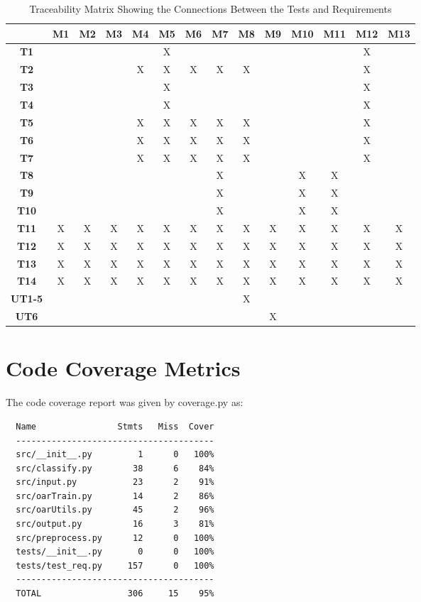 \documentclass[12pt, titlepage]{article}
\begin{document}
\begin{emumerate}
\begin{table}[h!]
  \centering
  \begin{tabular}{|c|c|c|c|c|c|c|c|c|c|c|c|c|c|}
  \hline
    & M1
    & M2
    & M3
    & M4
    & M5
    & M6
    & M7
    & M8
    & M9
    & M10
    & M11
    & M12
    & M13
  \\ \hline
  \textbf{T1}            & & & & &X& & & & & & &X& \\ \hline
  \textbf{T2}            & & & &X&X&X&X&X& & & &X& \\ \hline
  \textbf{T3}           & & & & &X& & & & & & &X& \\ \hline
  \textbf{T4}             & & & & &X& & & & & & &X& \\ \hline
  \textbf{T5}           & & & &X&X&X&X&X& & & &X& \\ \hline
  \textbf{T6}           & & & &X&X&X&X&X& & & &X& \\ \hline
  \textbf{T7}           & & & &X&X&X&X&X& & & &X& \\ \hline
  \textbf{T8}              & & & & & & &X& & &X&X& & \\ \hline
  \textbf{T9}              & & & & & & &X& & &X&X& & \\ \hline
  \textbf{T10}             & & & & & & &X& & &X&X& & \\ \hline
  \textbf{T11}      &X&X&X&X&X&X&X&X&X&X&X&X&X\\ \hline
  \textbf{T12}               &X&X&X&X&X&X&X&X&X&X&X&X&X\\ \hline
  \textbf{T13}              &X&X&X&X&X&X&X&X&X&X&X&X&X\\ \hline
  \textbf{T14}           &X&X&X&X&X&X&X&X&X&X&X&X&X\\ \hline
  \textbf{UT1-5}                & & & & & & & &X& & & & & \\ \hline
  \textbf{UT6}                  & & & & & & & & &X& & & & \\ \hline
  \end{tabular}
  \caption{Traceability Matrix Showing the Connections Between the Tests and Requirements}
  \label{Table:B_trace}
\end{table}

\section{Code Coverage Metrics}

The code coverage report was given by coverage.py as:

\begin{verbatim}
  Name                Stmts   Miss  Cover
  ---------------------------------------
  src/__init__.py         1      0   100%
  src/classify.py        38      6    84%
  src/input.py           23      2    91%
  src/oarTrain.py        14      2    86%
  src/oarUtils.py        45      2    96%
  src/output.py          16      3    81%
  src/preprocess.py      12      0   100%
  tests/__init__.py       0      0   100%
  tests/test_req.py     157      0   100%
  ---------------------------------------
  TOTAL                 306     15    95%
\end{verbatim}


\end{emumerate}
\end{document}
